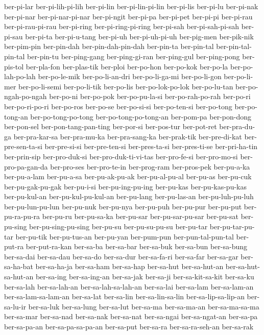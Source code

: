 {ber-pi-lar ber-pi-lih-pi-lih ber-pi-lin ber-pi-lin-pi-lin ber-pi-lis
ber-pi-lu ber-pi-nak ber-pi-nar ber-pi-nar-pi-nar ber-pi-ngit ber-pi-pa
ber-pi-pet ber-pi-pi ber-pi-rau ber-pi-rau-pi-rau ber-pi-ring
ber-pi-ring-pi-ring ber-pi-sah ber-pi-sah-pi-sah ber-pi-sau ber-pi-ta
ber-pi-u-tang ber-pi-uh ber-pi-uh-pi-uh ber-pig-men ber-pik-nik
ber-pim-pin ber-pin-dah ber-pin-dah-pin-dah ber-pin-ta ber-pin-tal
ber-pin-tal-pin-tal ber-pin-tu ber-ping-gang ber-ping-gi-ran ber-ping-gul
ber-ping-pong ber-pis-tol ber-pla-fon ber-plas-tik ber-ploi ber-po-hon
ber-po-kok ber-po-la ber-po-lah-po-lah ber-po-le-mik ber-po-li-an-dri
ber-po-li-ga-mi ber-po-li-gon ber-po-li-mer ber-po-li-semi ber-po-li-tik
ber-po-lis ber-po-lok-po-lok ber-po-lu-tan ber-po-ngah-po-ngah ber-po-ni
ber-po-pok ber-po-pu-la-si ber-po-rah-po-rah ber-po-ri ber-po-ri-po-ri
ber-po-ros ber-po-se ber-po-si-si ber-po-ten-si ber-po-tong ber-po-tong-an
ber-po-tong-po-tong ber-po-tong-po-tong-an ber-pom-pa ber-pon-dong
ber-pon-sel ber-pon-tang-pan-ting ber-por-si ber-pos-tur ber-pot-ret
ber-pra-du-ga ber-pra-kar-sa ber-pra-mu-ka ber-pra-sang-ka ber-prak-tik
ber-pre-di-kat ber-pre-sen-ta-si ber-pre-si-si ber-pre-ten-si
ber-pres-ta-si ber-pres-ti-se ber-pri-ha-tin ber-prin-sip ber-pro-duk-si
ber-pro-duk-ti-vi-tas ber-pro-fe-si ber-pro-mo-si ber-pro-pa-gan-da
ber-pro-ses ber-pro-te-in ber-prog-ram ber-pros-pek ber-pu-a-ka
ber-pu-a-lam ber-pu-a-sa ber-pu-ak-pu-ak ber-pu-al-pu-al ber-pu-as
ber-pu-cuk ber-pu-gak-pu-gak ber-pu-i-si ber-pu-ing-pu-ing ber-pu-kas
ber-pu-kas-pu-kas ber-pu-kul-an ber-pu-kul-pu-kul-an ber-pu-lang
ber-pu-las-an ber-pu-luh-pu-luh ber-pu-lun-pu-lun ber-pu-nuk ber-pu-nya
ber-pu-puh ber-pu-pur ber-pu-put ber-pu-ra-pu-ra ber-pu-ru ber-pu-sa-ka
ber-pu-sar ber-pu-sar-pu-sar ber-pu-sat ber-pu-sing ber-pu-sing-pu-sing
ber-pu-su ber-pu-su-pu-su ber-pu-tar ber-pu-tar-pu-tar ber-pu-tik
ber-pu-tus-an ber-pu-yan ber-pum-pun ber-pun-tal-pun-tal ber-put-ra
ber-put-ra-kan ber-sa-ba ber-sa-bar ber-sa-buk ber-sa-bun ber-sa-bung
ber-sa-dai ber-sa-dau ber-sa-do ber-sa-dur ber-sa-fa-ri ber-sa-far
ber-sa-gar ber-sa-ha-bat ber-sa-ha-ja ber-sa-ham ber-sa-hap ber-sa-hut
ber-sa-hut-an ber-sa-hut-sa-hut-an ber-sa-ing ber-sa-ing-an ber-sa-jak
ber-sa-ji ber-sa-kit-sa-kit ber-sa-ku ber-sa-lah ber-sa-lah-an
ber-sa-lah-sa-lah-an ber-sa-lai ber-sa-lam ber-sa-lam-an
ber-sa-lam-sa-lam-an ber-sa-lat ber-sa-lin ber-sa-lin-sa-lin
ber-sa-lip-sa-lip-an ber-sa-lu-ir ber-sa-luk ber-sa-lung ber-sa-lut
ber-sa-ma ber-sa-ma-an ber-sa-ma-sa-ma ber-sa-mar ber-sa-nad ber-sa-nak
ber-sa-nat ber-sa-ngai ber-sa-ngat-an ber-sa-pa ber-sa-pa-an
ber-sa-pa-sa-pa-an ber-sa-put ber-sa-ra ber-sa-ra-seh-an ber-sa-rak
}
